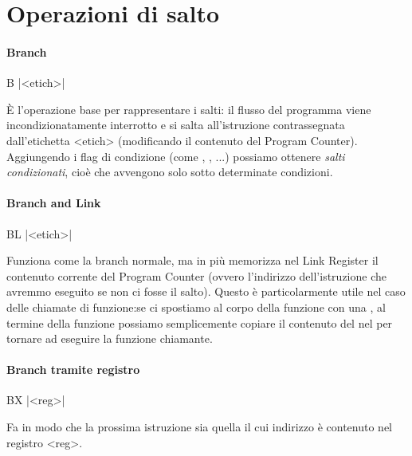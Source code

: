 \section{Operazioni di salto}

\paragraph*{Branch}
\begin{ARMcode}
    B |<etich>|
\end{ARMcode}
È l'operazione base per rappresentare i salti: il flusso del programma viene incondizionatamente interrotto e si salta all'istruzione contrassegnata dall'etichetta <etich> (modificando il contenuto del Program Counter). Aggiungendo i flag di condizione (come , , ...) possiamo ottenere \emph{salti condizionati}, cioè che avvengono solo sotto determinate condizioni.

\paragraph*{Branch and Link}
\begin{ARMcode}
    BL |<etich>|
\end{ARMcode}
Funziona come la branch normale, ma in più memorizza nel Link Register il contenuto corrente del Program Counter (ovvero l'indirizzo dell'istruzione che avremmo eseguito se non ci fosse il salto). Questo è particolarmente utile nel caso delle chiamate di funzione:se ci spostiamo al corpo della funzione con una , al termine della funzione possiamo semplicemente copiare il contenuto del  nel  per tornare ad eseguire la funzione chiamante.

\paragraph{Branch tramite registro}
\begin{ARMcode}
    BX |<reg>|
\end{ARMcode}
Fa in modo che la prossima istruzione sia quella il cui indirizzo è contenuto nel registro <reg>.